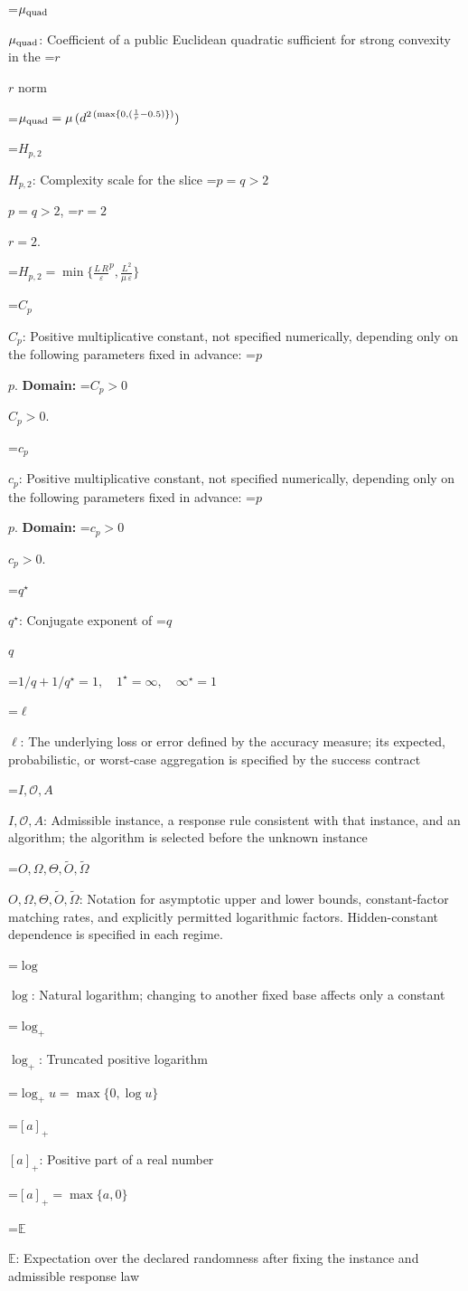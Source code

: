 \documentclass[10pt,a4paper]{article}
\newcommand{\AtlasMath}[1]{\par\begingroup\centering\setbox0=\hbox{$\displaystyle #1$}\ifdim\wd0>1.4\linewidth\typeout{ATLAS WIDE FORMULA: \the\wd0}\fi\ifdim\wd0>\linewidth\resizebox{\linewidth}{!}{\box0}\else\box0\fi\par\endgroup}
\newcommand{\AtlasInlineMath}[1]{\begingroup\setbox0=\hbox{$#1$}\ifdim\wd0>.4\linewidth\endgroup\AtlasMath{#1}\else\endgroup$#1$\fi}
\begin{document}
\AtlasInlineMath{\mu_{\rm quad}}: Coefficient of a public Euclidean quadratic sufficient for strong convexity in the \AtlasInlineMath{r} norm


\AtlasMath{\mu_{\rm quad}=\mu\,({d}^{2\,(\max\{0,(\frac{1}{r}-0.5)\})})}


\AtlasInlineMath{H_{p,2}}: Complexity scale for the slice \AtlasInlineMath{p=q>2}, \AtlasInlineMath{r=2}.


\AtlasMath{H_{p,2}=\min\{{\frac{L\,R}{\varepsilon}}^{p},\frac{{L}^{2}}{\mu\,\varepsilon}\}}


\AtlasInlineMath{C_{p}}: Positive multiplicative constant, not specified numerically, depending only on the following parameters fixed in advance: \AtlasInlineMath{p}. \textbf{Domain:} \AtlasInlineMath{C_{p}>0}.

\AtlasInlineMath{c_{p}}: Positive multiplicative constant, not specified numerically, depending only on the following parameters fixed in advance: \AtlasInlineMath{p}. \textbf{Domain:} \AtlasInlineMath{c_{p}>0}.

\AtlasInlineMath{q^\star}: Conjugate exponent of \AtlasInlineMath{q}


\AtlasMath{1/q+1/q^\star=1,\quad1^\star=\infty,\quad\infty^\star=1}


\AtlasInlineMath{\ell}: The underlying loss or error defined by the accuracy measure; its expected, probabilistic, or worst-case aggregation is specified by the success contract

\AtlasInlineMath{I,\mathcal{O},A}: Admissible instance, a response rule consistent with that instance, and an algorithm; the algorithm is selected before the unknown instance

\AtlasInlineMath{O,\Omega,\Theta,\widetilde{O},\widetilde\Omega}: Notation for asymptotic upper and lower bounds, constant-factor matching rates, and explicitly permitted logarithmic factors. Hidden-constant dependence is specified in each regime.

\AtlasInlineMath{\log}: Natural logarithm; changing to another fixed base affects only a constant

\AtlasInlineMath{\log_+}: Truncated positive logarithm


\AtlasMath{\log_+u=\max\{0,\log u\}}


\AtlasInlineMath{[a]_+}: Positive part of a real number


\AtlasMath{[a]_+=\max\{a,0\}}


\AtlasInlineMath{\mathbb{E}}: Expectation over the declared randomness after fixing the instance and admissible response law
\end{document}
